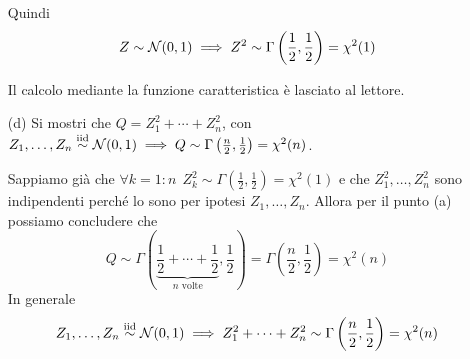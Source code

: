 \begin{enumerate}
Quindi
\[
Z\sim\mathcal{N}(0,1)\implies Z^2\sim\Gamma\left(\frac{1}{2},\frac{1}{2}\right)=\chi^2(1)
\]
\begin{oss}
Il calcolo mediante la funzione caratteristica è lasciato al lettore.
\end{oss}

\item [(d)] Si mostri che $Q=Z_1^2+\cdots+Z_n^2$, con $Z_1,\dots,Z_n\stackrel{\mathrm{iid}}{\sim}\mathcal{N}(0,1)\implies Q\sim\Gamma\left(\frac{n}{2},\frac{1}{2}\right)=\chi^2(n)$.

Sappiamo già che $\forall k=1:n\ \ Z_k^2\sim\Gamma\left(\frac{1}{2},\frac{1}{2}\right)=\chi^2(1)$ e che $Z_1^2,\dots,Z_n^2$ sono indipendenti perché lo sono per ipotesi $Z_1,\dots,Z_n$. Allora per il punto (a) possiamo concludere che
\[
Q\sim\Gamma\left(\underbrace{\frac{1}{2}+\cdots+\frac{1}{2}}_{n\text{ volte}}, \frac{1}{2}  \right)=\Gamma\left(  \frac{n}{2},\frac{1}{2} \right)=\chi^2(n)
\]
In generale
\[
Z_1,\dots,Z_n\stackrel{\mathrm{iid}}{\sim}\mathcal{N}(0,1)\implies Z_1^2+\cdots+Z_n^2\sim\Gamma\left(\frac{n}{2},\frac{1}{2}\right)=\chi^2(n)
\]
\end{enumerate}

